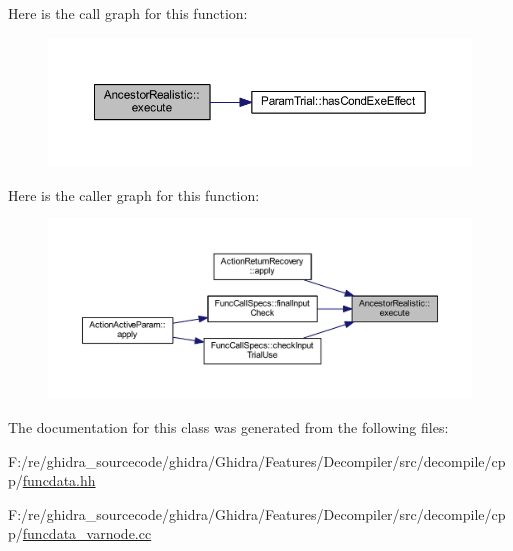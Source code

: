 Here is the call graph for this function\+:
\nopagebreak
\begin{figure}[H]
\begin{center}
\leavevmode
\includegraphics[width=350pt]{class_ancestor_realistic_a5812787dc51e5f5238f8b595ed8cf084_cgraph}
\end{center}
\end{figure}
Here is the caller graph for this function\+:
\nopagebreak
\begin{figure}[H]
\begin{center}
\leavevmode
\includegraphics[width=350pt]{class_ancestor_realistic_a5812787dc51e5f5238f8b595ed8cf084_icgraph}
\end{center}
\end{figure}


The documentation for this class was generated from the following files\+:\begin{DoxyCompactItemize}
\item 
F\+:/re/ghidra\+\_\+sourcecode/ghidra/\+Ghidra/\+Features/\+Decompiler/src/decompile/cpp/\mbox{\hyperlink{funcdata_8hh}{funcdata.\+hh}}\item 
F\+:/re/ghidra\+\_\+sourcecode/ghidra/\+Ghidra/\+Features/\+Decompiler/src/decompile/cpp/\mbox{\hyperlink{funcdata__varnode_8cc}{funcdata\+\_\+varnode.\+cc}}\end{DoxyCompactItemize}
